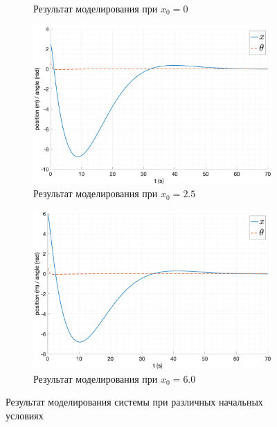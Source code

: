 \begin{figure}[ht!]
\begin{subfigure}[b]{0.45\textwidth}
        \caption{Результат моделирования при $x_0 = 0$}
    \end{subfigure}
    \begin{subfigure}[b]{0.45\textwidth}    
        \centering
        \includegraphics[width=\textwidth]{media/plots/LQR/out_8.png}
        \caption{Результат моделирования при $x_0 = 2.5$}
    \end{subfigure}
    \begin{subfigure}[b]{0.45\textwidth}
        \centering
        \includegraphics[width=\textwidth]{media/plots/LQR/out_9.png}
        \caption{Результат моделирования при $x_0 = 6.0$}
    \end{subfigure}
    \caption{Результат моделирования системы при различных начальных условиях}      
    \label{fig:lqr_controller_3}
\end{figure}
